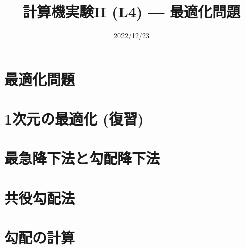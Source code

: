\documentclass[10pt,dvipdfmx]{beamer}
\title{計算機実験II (L4) --- 最適化問題}
\date{2022/12/23}
\begin{document}
\begin{frame}
  \titlepage
  \tableofcontents
\end{frame}



\section{最適化問題}




\section{1次元の最適化 (復習)}







\section{最急降下法と勾配降下法}



% 
% 

\section{共役勾配法}










\section{勾配の計算}


% 











\end{document}
